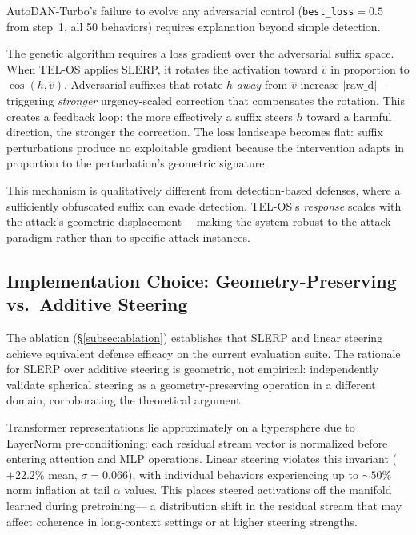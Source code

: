 \documentclass{article}
\begin{document}
AutoDAN-Turbo's failure to evolve any adversarial control
(\texttt{best\_loss}$=0.5$ from step~1, all 50 behaviors) requires explanation
beyond simple detection.

The genetic algorithm requires a loss gradient over the adversarial suffix space.
When TEL-OS applies SLERP, it rotates the activation toward $\hat{v}$ in
proportion to $\cos(h, \hat{v})$.
Adversarial suffixes that rotate $h$ \textit{away} from $\hat{v}$ increase
$|\text{raw\_d}|$---triggering \textit{stronger} urgency-scaled correction that compensates
the rotation.
This creates a feedback loop: the more effectively a suffix steers $h$ toward a
harmful direction, the stronger the correction.
The loss landscape becomes flat: suffix perturbations produce no exploitable
gradient because the intervention adapts in proportion to the perturbation's
geometric signature.

This mechanism is qualitatively different from detection-based defenses, where a
sufficiently obfuscated suffix can evade detection.
TEL-OS's \textit{response} scales with the attack's geometric displacement---
making the system robust to the attack paradigm rather than to specific
attack instances.

\subsection{Implementation Choice: Geometry-Preserving vs.\ Additive Steering}
\label{subsec:slerp_geometry}

The ablation (\S\ref{subsec:ablation}) establishes that SLERP and linear steering
achieve equivalent defense efficacy on the current evaluation suite.
The rationale for SLERP over additive steering is geometric, not empirical:
\citet{you2026spherical} independently validate spherical steering as a
geometry-preserving operation in a different domain, corroborating the
theoretical argument.

Transformer representations lie approximately on a hypersphere due to LayerNorm
pre-conditioning: each residual stream vector is normalized before entering
attention and MLP operations.
Linear steering violates this invariant ($+22.2\%$ mean, $\sigma=0.066$), with
individual behaviors experiencing up to ${\sim}50\%$ norm inflation at tail
$\alpha$ values.
This places steered activations off the manifold learned during pretraining---
a distribution shift in the residual stream that may affect coherence in
long-context settings or at higher steering strengths.
\end{document}
